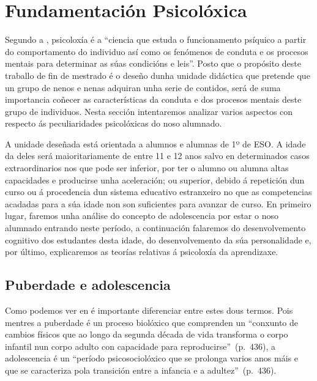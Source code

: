 

\section{Fundamentación Psicolóxica}

Segundo a , psicoloxía é a ``ciencia que estuda o funcionamento psíquico a partir do comportamento do individuo así como os fenómenos de conduta e os procesos mentais para determinar as súas condicións e leis''. Posto que o propósito deste traballo de fin de mestrado é o deseño dunha unidade didáctica que pretende que un grupo de nenos e nenas adquiran unha serie de contidos, será de suma importancia coñecer as características da conduta e dos procesos mentais deste grupo de individuos. Nesta sección intentaremos analizar varios aspectos con respecto ás peculiaridades psicolóxicas do noso alumnado.

A unidade deseñada está orientada a alumnos e alumnas de 1º de ESO. A idade da deles será maioritariamente de entre 11 e 12 anos salvo en determinados casos extraordinarios nos que pode ser inferior, por ter o alumno ou alumna altas capacidades e producirse unha aceleración; ou superior, debido á repetición dun curso ou á procedencia dun sistema educativo estranxeiro no que as competencias acadadas para a súa idade non son suficientes para avanzar de curso. En primeiro lugar, faremos unha análise do concepto de adolescencia por estar o noso alumnado entrando neste período, a continuación falaremos do desenvolvemento cognitivo dos estudantes desta idade, do desenvolvemento da súa personalidade e, por último, explicaremos as teorías relativas á psicoloxía da aprendizaxe.

\subsection{Puberdade e adolescencia}
Como podemos ver en  é importante diferenciar entre estes dous termos. Pois mentres a puberdade é un proceso biolóxico que comprenden un ``conxunto de cambios físicos que ao longo da segunda década de vida transforma o corpo infantil nun corpo adulto con capacidade para reproducirse''~(p.~436), a adolescencia é un ``período psicosociolóxico que se prolonga varios anos máis e que se caracteriza pola transición entre a infancia e a adultez''~(p.~436).

